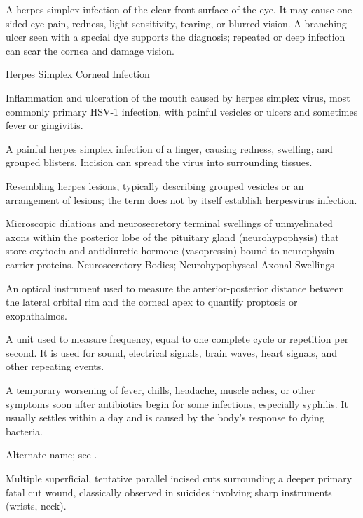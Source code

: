  A herpes simplex infection of the clear front surface of the eye. It may cause one-sided eye pain, redness, light sensitivity, tearing, or blurred vision. A branching ulcer seen with a special dye supports the diagnosis; repeated or deep infection can scar the cornea and damage vision.

\synonyms
Herpes Simplex Corneal Infection

 Inflammation and ulceration of the mouth caused by herpes simplex virus, most commonly primary HSV-1 infection, with painful vesicles or ulcers and sometimes fever or gingivitis.

 A painful herpes simplex infection of a finger, causing redness, swelling, and grouped blisters. Incision can spread the virus into surrounding tissues.

 Resembling herpes lesions, typically describing grouped vesicles or an arrangement of lesions; the term does not by itself establish herpesvirus infection.

 Microscopic dilations and neurosecretory terminal swellings of unmyelinated axons within the posterior lobe of the pituitary gland (neurohypophysis) that store oxytocin and antidiuretic hormone (vasopressin) bound to neurophysin carrier proteins.
\synonyms
Neurosecretory Bodies; Neurohypophyseal Axonal Swellings

 An optical instrument used to measure the anterior-posterior distance between the lateral orbital rim and the corneal apex to quantify proptosis or exophthalmos.

 A unit used to measure frequency, equal to one complete cycle or repetition per second. It is used for sound, electrical signals, brain waves, heart signals, and other repeating events.

 A temporary worsening of fever, chills, headache, muscle aches, or other symptoms soon after antibiotics begin for some infections, especially syphilis. It usually settles within a day and is caused by the body’s response to dying bacteria.

 Alternate name; see .

 Multiple superficial, tentative parallel incised cuts surrounding a deeper primary fatal
cut wound, classically observed in suicides involving sharp instruments (wrists, neck).

